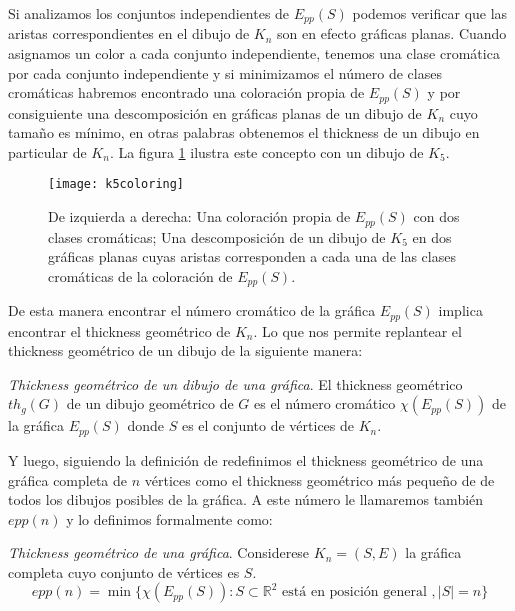 Si analizamos los conjuntos independientes de $E_{pp}(S)$ podemos verificar
que las aristas correspondientes en el dibujo de $K_n$ son en efecto gráficas planas.
Cuando asignamos un color a cada conjunto independiente, tenemos una clase
cromática por cada conjunto independiente y si minimizamos el número de clases cromáticas
habremos encontrado una coloración propia de $E_{pp}(S)$ y por consiguiente una descomposición
en gráficas planas de un dibujo de $K_n$ cuyo tamaño es mínimo, en otras palabras obtenemos
el thickness de un dibujo en particular de $K_n$. La figura \ref{fig:k5coloring}
ilustra este concepto con un dibujo de $K_5$.

\begin{figure}
  \centering
  \texttt{[image: k5coloring]}
  \caption{De izquierda a derecha: Una coloración propia de $E_{pp}(S)$ con dos
  clases cromáticas; Una descomposición de un dibujo de $K_5$ en dos gráficas planas
  cuyas aristas corresponden a cada una de las clases cromáticas de la coloración
  de $E_{pp}(S)$.}
  \label{fig:k5coloring}
\end{figure}

De esta manera encontrar el número cromático de la gráfica $E_{pp}(S)$ implica
encontrar el thickness geométrico de $K_n$. Lo que nos permite replantear el thickness
geométrico de un dibujo de la siguiente manera:
\begin{definition}{\emph{Thickness geométrico de un dibujo de una gráfica}.}
  El thickness geométrico $th_g(G)$ de un dibujo geométrico de $G$ es el número cromático
  $\chi(E_{pp}(S))$ de la gráfica $E_{pp}(S)$ donde $S$ es el conjunto de vértices de $K_n$.
\end{definition}
Y luego, siguiendo la definición de \cite{Dillencourt2004} redefinimos el thickness
geométrico de una gráfica completa de $n$ vértices como el thickness geométrico
más pequeño de de todos los dibujos posibles de la gráfica.
A este número le llamaremos también $epp(n)$ y lo definimos formalmente como:
\begin{definition}{\emph{Thickness geométrico de una gráfica}.}
  Considerese $K_n=(S,E)$ la gráfica completa cuyo conjunto de vértices es $S$.
  \[epp(n) = \min\{ \chi(E_{pp}(S)): S \subset \mathbb{R}^2 \text{ está en posición general }, |S|=n \}\]
\end{definition}

